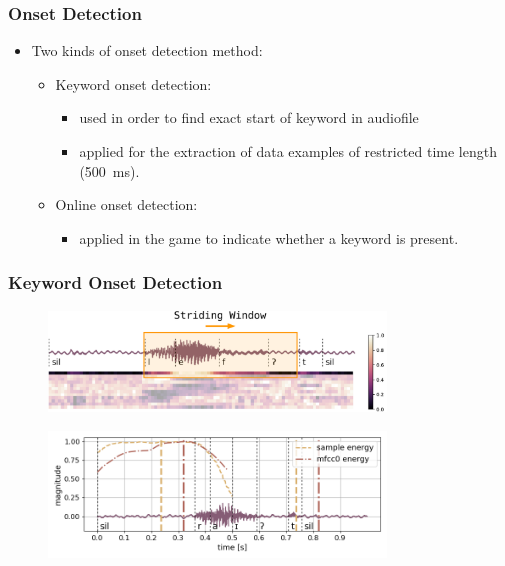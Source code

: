 \begin{frame}
  \frametitle{Onset Detection}
  \begin{itemize}
    \item Two kinds of onset detection method:
    \begin{itemize}
      \item Keyword onset detection:
        \begin{itemize}
          \item used in order to find exact start of keyword in audiofile
          \item applied for the extraction of data examples of restricted time length (\SI{500}{\milli\second}).
        \end{itemize}
      \item Online onset detection:
        \begin{itemize}
          \item applied in the game to indicate whether a keyword is present.
        \end{itemize}
    \end{itemize}
  \end{itemize}
\end{frame}

\begin{frame}
  \frametitle{Keyword Onset Detection}
  \vspace{-0.5cm}
  \begin{figure} \includegraphics[width=0.8\textwidth]{../3_signal/figs/signal_onset_window.pdf} \end{figure}
  \begin{figure} \includegraphics[width=0.8\textwidth]{../3_signal/figs/signal_onset_showcase_right0.png} \end{figure}
\end{frame}